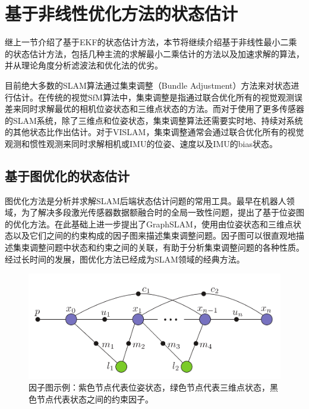\section{基于非线性优化方法的状态估计}

继上一节介绍了基于EKF的状态估计方法，本节将继续介绍基于非线性最小二乘的状态估计方法，包括几种主流的求解最小二乘估计的方法以及加速求解的算法，并从理论角度分析滤波法和优化法的优劣。

目前绝大多数的SLAM算法通过集束调整\citep{triggs1999bundle}（Bundle Adjustment）方法来对状态进行估计。在传统的视觉SfM算法中，集束调整是指通过联合优化所有的视觉观测误差来同时求解最优的相机位姿状态和三维点状态的方法。而对于使用了更多传感器的SLAM系统，除了三维点和位姿状态，集束调整算法还需要实时地、持续对系统的其他状态比作出估计。对于VISLAM，集束调整通常会通过联合优化所有的视觉观测和惯性观测来同时求解相机或IMU的位姿、速度以及IMU的bias状态。

\subsection{基于图优化的状态估计}

图优化方法是分析并求解SLAM后端状态估计问题的常用工具。最早在机器人领域，为了解决多段激光传感器数据额融合时的全局一致性问题，\citep{lu1997globally,lu1997robot}提出了基于位姿图的优化方法。\citep{thrun2006graph}在此基础上进一步提出了GraphSLAM，使用由位姿状态和三维点状态以及它们之间的约束构成的因子图来描述集束调整问题。因子图可以很直观地描述集束调整问题中状态和约束之间的关联，有助于分析集束调整问题的各种性质。经过长时间的发展，图优化方法已经成为SLAM领域的经典方法。

\begin{figure}[htb!]
    \centering
    \includegraphics[width=.6\textwidth]{Pictures/isam_factor_graph.png}
    \caption{因子图示例\citep{kaess2012isam2}：紫色节点代表位姿状态，绿色节点代表三维点状态，黑色节点代表状态之间的约束因子。}
    \label{fig:isam_factor_graph}
\end{figure}

